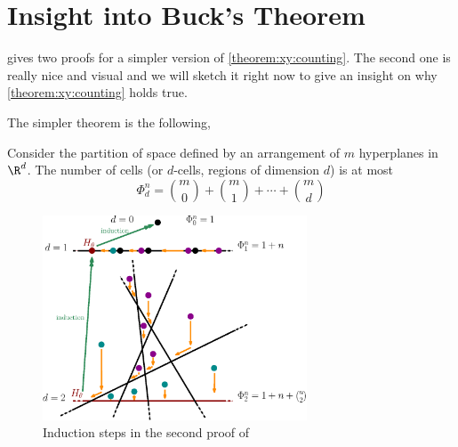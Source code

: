 \section{Insight into Buck's Theorem}

\citet*{matousek:2002} gives two proofs for a simpler version of
\ref{theorem:xy:counting}. The second one is really nice and visual and we will
sketch it right now to give an insight on why \ref{theorem:xy:counting} holds
true.

The simpler theorem is the following,

\begin{theorem}
Consider the partition of space defined by an arrangement of \(m\) hyperplanes
in \(\R^d\). The number of cells (or \(d\)-cells, regions of dimension \(d\))
is at most
\begin{displaymath}
\Phi_d^n = \binom{m}{0} + \binom{m}{1} + \cdots + \binom{m}{d}
\end{displaymath}
\end{theorem}

\begin{figure}
\centering
\includegraphics[width=0.7\textwidth]{fig/x+y/buck/arrangement}
\caption{Induction steps in the second proof of \citet*{matousek:2002}}
\label{fig:xy:buck:arrangement}
\end{figure}

